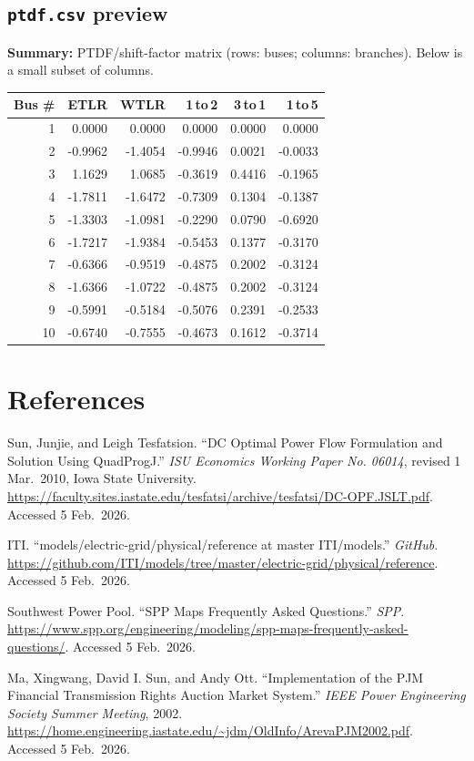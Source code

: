 \documentclass[11pt]{article}
\begin{document}
\subsection{\texttt{ptdf.csv} preview}
\textbf{Summary:} PTDF/shift-factor matrix (rows: buses; columns: branches). Below is a small subset of columns.

\scriptsize
\begin{longtable}{@{}rrrrrr@{}}
\toprule
Bus \# & ETLR & WTLR & 1\,to\,2 & 3\,to\,1 & 1\,to\,5 \\
\midrule
\endhead
1  & 0.0000  & 0.0000  & 0.0000  & 0.0000  & 0.0000 \\
2  & -0.9962 & -1.4054 & -0.9946 & 0.0021  & -0.0033 \\
3  & 1.1629  & 1.0685  & -0.3619 & 0.4416  & -0.1965 \\
4  & -1.7811 & -1.6472 & -0.7309 & 0.1304  & -0.1387 \\
5  & -1.3303 & -1.0981 & -0.2290 & 0.0790  & -0.6920 \\
6  & -1.7217 & -1.9384 & -0.5453 & 0.1377  & -0.3170 \\
7  & -0.6366 & -0.9519 & -0.4875 & 0.2002  & -0.3124 \\
8  & -1.6366 & -1.0722 & -0.4875 & 0.2002  & -0.3124 \\
9  & -0.5991 & -0.5184 & -0.5076 & 0.2391  & -0.2533 \\
10 & -0.6740 & -0.7555 & -0.4673 & 0.1612  & -0.3714 \\
\bottomrule
\end{longtable}
\normalsize

\newpage
\section{References}
\begin{sloppypar}
\noindent
Sun, Junjie, and Leigh Tesfatsion. ``DC Optimal Power Flow Formulation and Solution Using QuadProgJ.'' \textit{ISU Economics Working Paper No. 06014}, revised 1 Mar.\ 2010, Iowa State University. \url{https://faculty.sites.iastate.edu/tesfatsi/archive/tesfatsi/DC-OPF.JSLT.pdf}. Accessed 5 Feb.\ 2026.
\end{sloppypar}

\noindent
ITI. ``models/electric-grid/physical/reference at master \textperiodcentered{} ITI/models.'' \textit{GitHub}. \url{https://github.com/ITI/models/tree/master/electric-grid/physical/reference}. Accessed 5 Feb.\ 2026.

\noindent
Southwest Power Pool. ``SPP Maps Frequently Asked Questions.'' \textit{SPP}. \url{https://www.spp.org/engineering/modeling/spp-maps-frequently-asked-questions/}. Accessed 5 Feb.\ 2026.

\noindent
Ma, Xingwang, David I. Sun, and Andy Ott. ``Implementation of the PJM Financial Transmission Rights Auction Market System.'' \textit{IEEE Power Engineering Society Summer Meeting}, 2002. \url{https://home.engineering.iastate.edu/~jdm/OldInfo/ArevaPJM2002.pdf}. Accessed 5 Feb.\ 2026.
\end{document}
